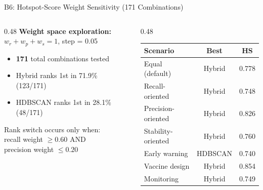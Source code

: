 \documentclass[aspectratio=169,11pt]{beamer}
\begin{document}
\begin{frame}{B6: Hotspot-Score Weight Sensitivity (171 Combinations)}

\begin{columns}[T]
\begin{column}{0.48\textwidth}
\textbf{Weight space exploration:}\\
$w_r + w_p + w_s = 1$, step = 0.05

\vspace{0.5em}
\begin{itemize}
  \item \textbf{171} total combinations tested
  \item Hybrid ranks 1st in \alert{71.9\%} (123/171)
  \item HDBSCAN ranks 1st in 28.1\% (48/171)
\end{itemize}

\vspace{0.5em}
Rank switch occurs only when:\\
recall weight $\geq 0.60$ AND\\
precision weight $\leq 0.20$
\end{column}

\begin{column}{0.48\textwidth}
\small
\begin{tabular}{lcc}
\toprule
\textbf{Scenario} & \textbf{Best} & \textbf{HS} \\
\midrule
Equal (default) & Hybrid & 0.778 \\
Recall-oriented & Hybrid & 0.748 \\
Precision-oriented & Hybrid & 0.826 \\
Stability-oriented & Hybrid & 0.760 \\
\rowcolor{alertred!8}
Early warning & HDBSCAN & 0.740 \\
Vaccine design & Hybrid & 0.854 \\
Monitoring & Hybrid & 0.749 \\
\bottomrule
\end{tabular}
\end{column}
\end{columns}
\end{frame}
\end{document}
